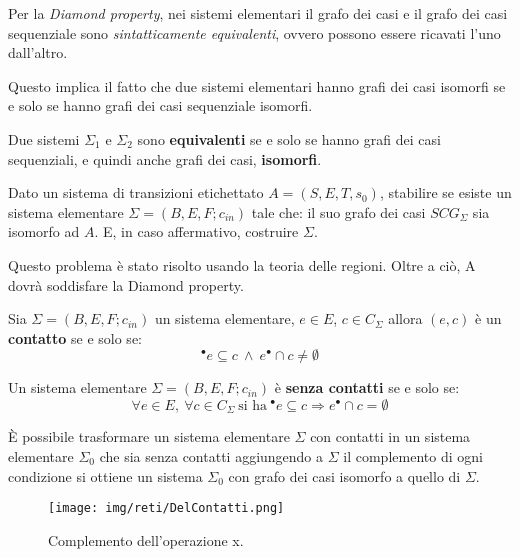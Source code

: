 Per la \textit{Diamond property}, nei sistemi elementari il grafo dei casi e il
grafo dei casi sequenziale sono \textit{sintatticamente equivalenti}, ovvero
possono essere ricavati l'uno dall'altro.

Questo implica il fatto che due sistemi elementari hanno grafi dei casi isomorfi
se e solo se hanno grafi dei casi sequenziale isomorfi.
\begin{definizione}
    Due sistemi $\Sigma_1$ e $\Sigma_2$ sono \textbf{equivalenti} se e solo se
    hanno grafi dei casi sequenziali, e quindi anche grafi dei casi, \textbf{isomorfi}.
\end{definizione}
\begin{definizione}
    Dato un sistema di transizioni etichettato $A = (S, E,T,s_0)$, stabilire se
    esiste un sistema elementare $\Sigma = (B, E, F; c_{in})$ tale che: il suo
    grafo dei casi $SCG_{\Sigma}$ sia isomorfo ad $A$. E, in caso affermativo,
    costruire $\Sigma$.

    Questo problema è stato risolto usando la teoria delle regioni. Oltre a ciò,
    A dovrà soddisfare la Diamond property.
\end{definizione}
\begin{definizione}
    Sia $\Sigma = (B, E, F; c_{in})$ un sistema elementare, $e \in E$, $c \in
        C_{\Sigma}$ allora $(e, c)$ è un \textbf{contatto} se e solo se:
    \begin{equation}
        ^{\bullet}e \subseteq c \ \land \ e^{\bullet} \cap c \neq \emptyset
    \end{equation}
\end{definizione}
\begin{definizione}
    Un sistema elementare $\Sigma = (B, E, F; c_{in})$ è \textbf{senza contatti}
    se e solo se:
    \begin{equation}
        \forall e \in E, \ \forall c \in C_{\Sigma} \ \text{si ha} \ ^{\bullet}e
        \subseteq c \Rightarrow e^{\bullet} \cap c = \emptyset
    \end{equation}
\end{definizione}
È possibile trasformare un sistema elementare $\Sigma$ con contatti in un
sistema elementare $\Sigma_0$ che sia senza contatti aggiungendo a $\Sigma$ il
complemento di ogni condizione si ottiene un sistema $\Sigma_0$ con grafo dei
casi isomorfo a quello di $\Sigma$.
\begin{figure}[!ht]
    \centering
    \texttt{[image: img/reti/DelContatti.png]}
    \caption{Complemento dell'operazione x.}
\end{figure}
